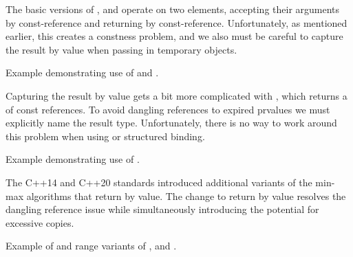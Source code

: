 The basic versions of ,  and  operate on two elements, accepting their arguments by const-reference and returning by const-reference. Unfortunately, as mentioned earlier, this creates a constness problem, and we also must be careful to capture the result by value when passing in temporary objects.


\begin{box-note}
\footnotesize Example demonstrating use of  and .
\tcblower
{}
\end{box-note}

Capturing the result by value gets a bit more complicated with , which returns a  of const references. To avoid dangling references to expired prvalues we must explicitly name the result type. Unfortunately, there is no way to work around this problem when using  or structured binding.

\begin{box-note}
\footnotesize Example demonstrating use of .
\tcblower
{}
\end{box-note}

The C++14 and C++20 standards introduced additional variants of the min-max algorithms that return by value. The change to return by value resolves the dangling reference issue while simultaneously introducing the potential for excessive copies.


\begin{box-note}
\footnotesize Example of  and range variants of ,  and .
\tcblower
{}
\end{box-note}

\subsection{\texorpdfstring{}{\texttt{std::clamp}}}

